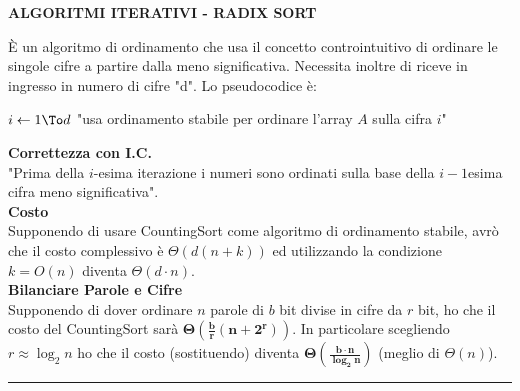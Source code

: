 \documentclass[9pt]{extarticle}
\newenvironment{formulario}
{
\setlength{\columnsep}{3em}
\twocolumn
\lstset{tabsize=3}
\begin{spacing}{1}
\begin{flushleft}
}{
\end{flushleft}
\end{spacing}
}
\newenvironment{tcenter}{
  \par
  \centering
  \setlength{\parskip}{0pt} %
  \noindent
}{
  \par
}
\newenvironment{code}[1]
{
\begin{codebox}
\Procname{$#1$}
}{
\end{codebox}
}
\newcommand{\myRule}{\rule{250pt}{0.1pt}}
\newcommand{\bo}[1]{\textbf{#1}}
\newcommand{\la}{\leftarrow}
\newcommand{\FOR}[1]{\For $#1$ \Do}
\begin{document}
\begin{formulario}
		\begin{tcenter}
\bo{ALGORITMI ITERATIVI - RADIX SORT}
		\end{tcenter}
È un algoritmo di ordinamento che usa il concetto controintuitivo di ordinare le singole cifre a partire dalla meno significativa. Necessita inoltre di riceve in ingresso in numero di cifre "d". Lo pseudocodice è: 
		\begin{code}{RadixSort(A,d)}
\li \FOR{i \la 1 \To d}
	\li "usa ordinamento stabile per ordinare l'array $A$ sulla cifra $i$"
\End
		\end{code}
\bo{Correttezza con I.C.}\\
"Prima della $i$-esima iterazione i numeri sono ordinati sulla base della $i-1$esima cifra meno significativa". \\
\bo{Costo}\\
Supponendo di usare CountingSort come algoritmo di ordinamento stabile, avrò che il costo complessivo è $\Theta(d(n+k))$ ed utilizzando la condizione $k=O(n)$ diventa $\Theta(d\cdot n)$. \\
\bo{Bilanciare Parole e Cifre} \\
Supponendo di dover ordinare $n$ parole di $b$ bit divise in cifre da $r$ bit, ho che il costo del CountingSort sarà $\bm{\Theta(\frac{b}{r}(n+2^r))}$. In particolare scegliendo $r\approx\log_2n$ ho che il costo (sostituendo) diventa $\bm{\Theta(\frac{b\cdot n}{\log_2n})}$ (meglio di $\Theta(n)$).
\myRule


\end{formulario}
\end{document}
